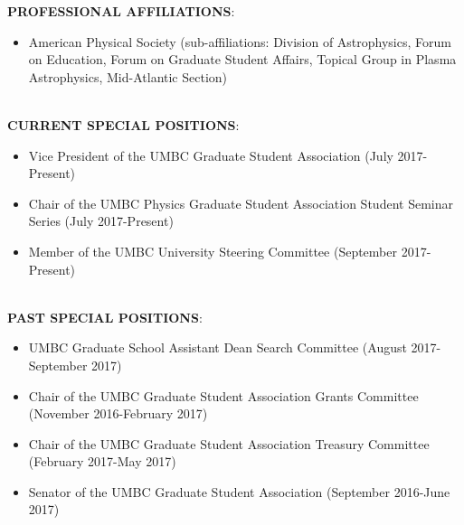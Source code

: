 \documentclass{article}
\begin{document}
\noindent \textbf{PROFESSIONAL AFFILIATIONS}:
\begin{itemize}
\item American Physical Society (sub-affiliations: Division of Astrophysics, Forum on Education, Forum on Graduate Student Affairs, Topical Group in Plasma Astrophysics, Mid-Atlantic Section)
\end{itemize}
\phantom \\
\noindent \textbf{CURRENT SPECIAL POSITIONS}:
\begin{itemize}
\item Vice President of the UMBC Graduate Student Association (July 2017-Present)
\item Chair of the UMBC Physics Graduate Student Association Student Seminar Series (July 2017-Present)
\item Member of the UMBC University Steering Committee (September 2017-Present)
\end{itemize}
\phantom \\
\noindent \textbf{PAST SPECIAL POSITIONS}:
\begin{itemize}
\item UMBC Graduate School Assistant Dean Search Committee (August 2017-September 2017)
\item Chair of the UMBC Graduate Student Association Grants Committee (November 2016-February 2017)
\item Chair of the UMBC Graduate Student Association Treasury Committee (February 2017-May 2017)
\item Senator of the UMBC Graduate Student Association (September 2016-June 2017)
\end{itemize}
\phantom \\
\end{document}
